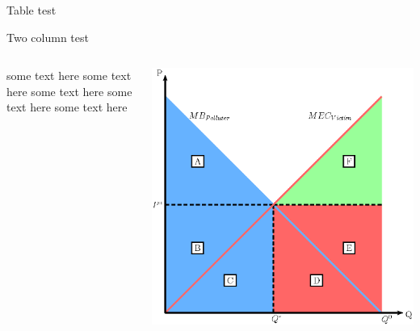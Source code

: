\documentclass[11pt, aspectratio=169]{beamer}
\begin{document}
\begin{frame}{Table test}
	\begin{table}
		\begin{adjustbox}{width=\textwidth, totalheight=\baselineskip,keepaspectratio}
			\centering
			\begin{threeparttable}
				\caption{Autoscaling table}
				
			\end{threeparttable}
		\end{adjustbox}
		\end{table}
\end{frame}

\begin{frame}{Two column test}
	\begin{columns}
		\begin{column}{0.5\textwidth}
		   some text here some text here some text here some text here some text here
		\end{column}
		\begin{column}{0.5\textwidth}  %
		    \begin{center}
		     \includegraphics[width=1\textwidth]{img/figure1.png}
		    \end{center}
		\end{column}
	\end{columns}
\end{frame}
\end{document}
